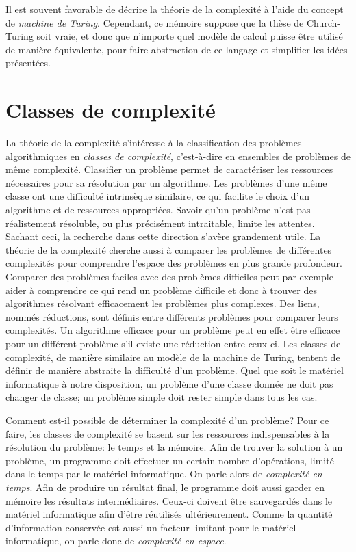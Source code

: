 Il est souvent favorable de décrire la théorie de la complexité à l'aide du concept de \textit{machine de Turing}. Cependant, ce mémoire suppose que la thèse de Church-Turing soit vraie, et donc que n'importe quel modèle de calcul puisse être utilisé de manière équivalente, pour faire abstraction de ce langage et simplifier les idées présentées.


\section{Classes de complexité}
\label{sec:classes-de-complexite}

La théorie de la complexité s'intéresse à la classification des problèmes algorithmiques en \textit{classes de complexité}, c'est-à-dire en ensembles de problèmes de même complexité. Classifier un problème permet de caractériser les ressources nécessaires pour sa résolution par un algorithme. Les problèmes d'une même classe ont une difficulté intrinsèque similaire, ce qui facilite le choix d'un algorithme et de ressources appropriées. Savoir qu'un problème n'est pas réalistement résoluble, ou plus précisément intraitable, limite les attentes. Sachant ceci, la recherche dans cette direction s'avère grandement utile. La théorie de la complexité cherche aussi à comparer les problèmes de différentes complexités pour comprendre l'espace des problèmes en plus grande profondeur. Comparer des problèmes faciles avec des problèmes difficiles peut par exemple aider à comprendre ce qui rend un problème difficile et donc à trouver des algorithmes résolvant efficacement les problèmes plus complexes. Des liens, nommés réductions, sont définis entre différents problèmes pour comparer leurs complexités. Un algorithme efficace pour un problème peut en effet être efficace pour un différent problème s'il existe une réduction entre ceux-ci. Les classes de complexité, de manière similaire au modèle de la machine de Turing, tentent de définir de manière abstraite la difficulté d'un problème. Quel que soit le matériel informatique à notre disposition, un problème d'une classe donnée ne doit pas changer de classe; un problème simple doit rester simple dans tous les cas.

Comment est-il possible de déterminer la complexité d'un problème? Pour ce faire, les classes de complexité se basent sur les ressources indispensables à la résolution du problème: le temps et la mémoire. Afin de trouver la solution à un problème, un programme doit effectuer un certain nombre d'opérations, limité dans le temps par le matériel informatique. On parle alors de \textit{complexité en temps}. Afin de produire un résultat final, le programme doit aussi garder en mémoire les résultats intermédiaires. Ceux-ci doivent être sauvegardés dans le matériel informatique afin d'être réutilisés ultérieurement. Comme la quantité d'information conservée est aussi un facteur limitant pour le matériel informatique, on parle donc de \textit{complexité en espace}. 


